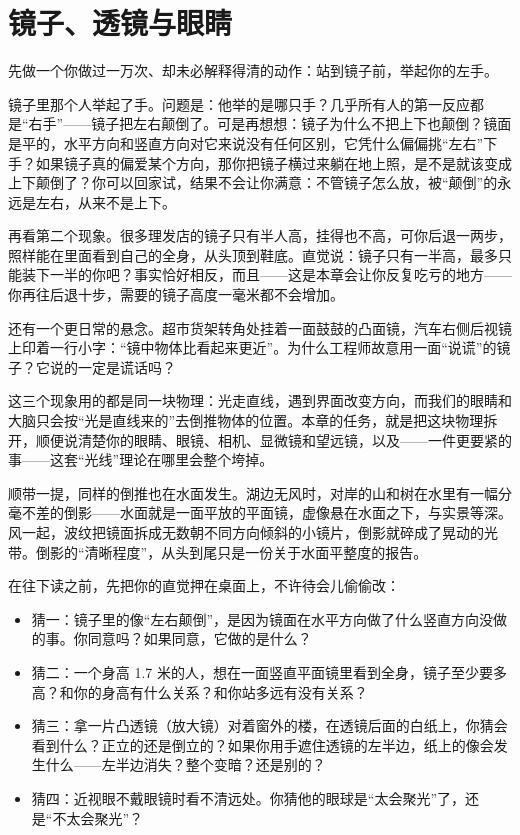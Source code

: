 \chapter{镜子、透镜与眼睛}

\begin{mainline}


先做一个你做过一万次、却未必解释得清的动作：站到镜子前，举起你的左手。

镜子里那个人举起了手。问题是：他举的是哪只手？几乎所有人的第一反应都是“右手”——镜子把左右颠倒了。可是再想想：镜子为什么不把上下也颠倒？镜面是平的，水平方向和竖直方向对它来说没有任何区别，它凭什么偏偏挑“左右”下手？如果镜子真的偏爱某个方向，那你把镜子横过来躺在地上照，是不是就该变成上下颠倒了？你可以回家试，结果不会让你满意：不管镜子怎么放，被“颠倒”的永远是左右，从来不是上下。

再看第二个现象。很多理发店的镜子只有半人高，挂得也不高，可你后退一两步，照样能在里面看到自己的全身，从头顶到鞋底。直觉说：镜子只有一半高，最多只能装下一半的你吧？事实恰好相反，而且——这是本章会让你反复吃亏的地方——你再往后退十步，需要的镜子高度一毫米都不会增加。

还有一个更日常的悬念。超市货架转角处挂着一面鼓鼓的凸面镜，汽车右侧后视镜上印着一行小字：“镜中物体比看起来更近”。为什么工程师故意用一面“说谎”的镜子？它说的一定是谎话吗？

这三个现象用的都是同一块物理：光走直线，遇到界面改变方向，而我们的眼睛和大脑只会按“光是直线来的”去倒推物体的位置。本章的任务，就是把这块物理拆开，顺便说清楚你的眼睛、眼镜、相机、显微镜和望远镜，以及——一件更要紧的事——这套“光线”理论在哪里会整个垮掉。

顺带一提，同样的倒推也在水面发生。湖边无风时，对岸的山和树在水里有一幅分毫不差的倒影——水面就是一面平放的平面镜，虚像悬在水面之下，与实景等深。风一起，波纹把镜面拆成无数朝不同方向倾斜的小镜片，倒影就碎成了晃动的光带。倒影的“清晰程度”，从头到尾只是一份关于水面平整度的报告。


在往下读之前，先把你的直觉押在桌面上，不许待会儿偷偷改：

\begin{itemize}
  \item 猜一：镜子里的像“左右颠倒”，是因为镜面在水平方向做了什么竖直方向没做的事。你同意吗？如果同意，它做的是什么？
  \item 猜二：一个身高 1.7 米的人，想在一面竖直平面镜里看到全身，镜子至少要多高？和你的身高有什么关系？和你站多远有没有关系？
  \item 猜三：拿一片凸透镜（放大镜）对着窗外的楼，在透镜后面的白纸上，你猜会看到什么？正立的还是倒立的？如果你用手遮住透镜的左半边，纸上的像会发生什么——左半边消失？整个变暗？还是别的？
  \item 猜四：近视眼不戴眼镜时看不清远处。你猜他的眼球是“太会聚光”了，还是“不太会聚光”？
\end{itemize}


\end{mainline}
